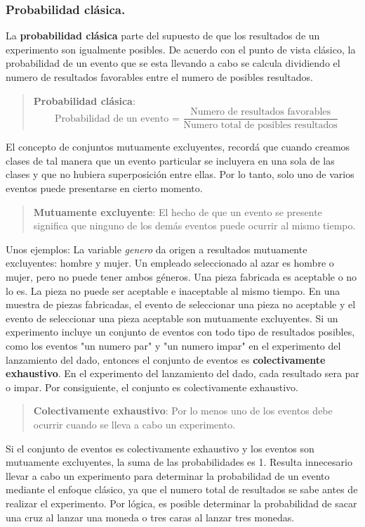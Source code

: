 \documentclass[]{article}
\begin{document}
\subsubsection*{Probabilidad clásica.}
La \textbf{probabilidad clásica} parte del supuesto de que los resultados de un experimento son igualmente posibles. De acuerdo con el punto de vista clásico, la probabilidad de un evento que se esta llevando a cabo se calcula dividiendo el numero de resultados favorables entre el numero de posibles resultados.
\begin{quote}
	\textbf{Probabilidad clásica}: \[\text{Probabilidad de un evento = } \frac{\text{Numero de resultados favorables}}{\text{Numero total de posibles resultados}} \]
\end{quote}
El concepto de conjuntos mutuamente excluyentes, recordá que cuando creamos clases de tal manera que un evento particular se incluyera en una sola de las clases y que no hubiera superposición entre ellas. Por lo tanto, solo uno de varios eventos puede presentarse en cierto momento.
\begin{quote}
	\textbf{Mutuamente excluyente}: El hecho de que un evento se presente significa que ninguno de los demás eventos puede ocurrir al mismo tiempo.
\end{quote}
Unos ejemplos: La variable \textit{genero} da origen a resultados mutuamente excluyentes: hombre y mujer. Un empleado seleccionado al azar es hombre o mujer, pero no puede tener ambos géneros. Una pieza fabricada es aceptable o no lo es. La pieza no puede ser aceptable e inaceptable al mismo tiempo. En una muestra de piezas fabricadas, el evento de seleccionar una pieza no aceptable y el evento de seleccionar una pieza aceptable son mutuamente excluyentes. \linebreak
Si un experimento incluye un conjunto de eventos con todo tipo de resultados posibles, como los eventos "un numero par" y "un numero impar" en el experimento del lanzamiento del dado, entonces el conjunto de eventos es \textbf{colectivamente exhaustivo}. En el experimento del lanzamiento del dado, cada resultado sera par o impar. Por consiguiente, el conjunto es colectivamente exhaustivo.
\begin{quote}
	\textbf{Colectivamente exhaustivo}: Por lo menos uno de los eventos debe ocurrir cuando se lleva a cabo un experimento.
\end{quote}
Si el conjunto de eventos es colectivamente exhaustivo y los eventos son mutuamente excluyentes, la suma de las probabilidades es 1. Resulta innecesario llevar a cabo un experimento para determinar la probabilidad de un evento mediante el enfoque clásico, ya que el numero total de resultados se sabe antes de realizar el experimento. Por lógica, es posible determinar la probabilidad de sacar una cruz al lanzar una moneda o tres caras al lanzar tres monedas.
\end{document}
